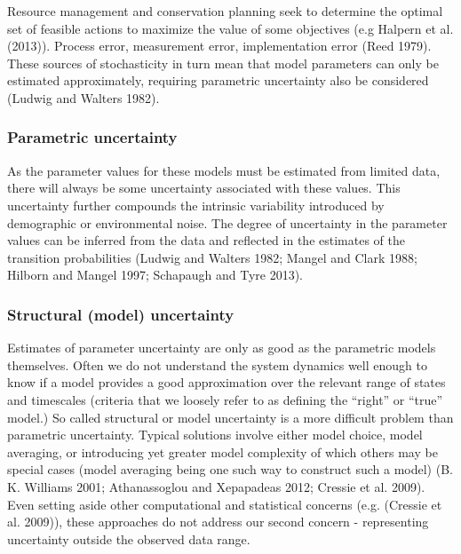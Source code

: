 \documentclass[author-year, review]{elsarticle} %
\begin{document}
Resource management and conservation planning seek to determine the
optimal set of feasible actions to maximize the value of some objectives
(e.g Halpern et al. (2013)). Process error, measurement error,
implementation error (Reed 1979). These sources of stochasticity in turn
mean that model parameters can only be estimated approximately,
requiring parametric uncertainty also be considered (Ludwig and Walters
1982).

\subsubsection{Parametric uncertainty}\label{parametric-uncertainty}

As the parameter values for these models must be estimated from limited
data, there will always be some uncertainty associated with these
values. This uncertainty further compounds the intrinsic variability
introduced by demographic or environmental noise. The degree of
uncertainty in the parameter values can be inferred from the data and
reflected in the estimates of the transition probabilities (Ludwig and
Walters 1982; Mangel and Clark 1988; Hilborn and Mangel 1997; Schapaugh
and Tyre 2013).

\subsubsection{Structural (model)
uncertainty}\label{structural-model-uncertainty}

Estimates of parameter uncertainty are only as good as the parametric
models themselves. Often we do not understand the system dynamics well
enough to know if a model provides a good approximation over the
relevant range of states and timescales (criteria that we loosely refer
to as defining the ``right'' or ``true'' model.) So called structural or
model uncertainty is a more difficult problem than parametric
uncertainty. Typical solutions involve either model choice, model
averaging, or introducing yet greater model complexity of which others
may be special cases (model averaging being one such way to construct
such a model) (B. K. Williams 2001; Athanassoglou and Xepapadeas 2012;
Cressie et al. 2009). Even setting aside other computational and
statistical concerns (e.g. (Cressie et al. 2009)), these approaches do
not address our second concern - representing uncertainty outside the
observed data range.
\end{document}
